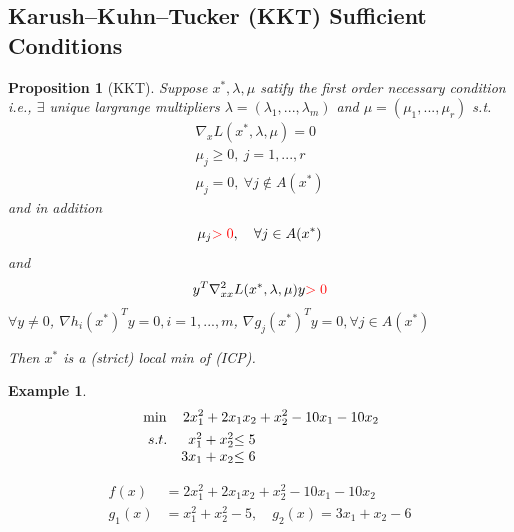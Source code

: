 \documentclass[11pt,a4paper]{article}
\newtheorem{proposition}{Proposition}
\newtheorem{example}{Example}
\begin{document}
\subsection{Karush–Kuhn–Tucker (KKT) Sufficient Conditions}
\begin{proposition}[KKT]
    Suppose $x^*,\lambda,\mu$ satify the first order necessary condition i.e., $\exists$ unique largrange multipliers $\lambda=(\lambda_1,...,\lambda_m)$ and $\mu=(\mu_1,...,\mu_r)$ s.t.
    \begin{equation}
        \begin{aligned}
            \nabla_xL(x^*,\lambda,\mu)=0\\
            \mu_j\geq 0,\ j=1,...,r\\
            \mu_j=0,\ \forall j\notin A(x^*)
        \end{aligned}
        \nonumber
    \end{equation}
    and in addition $$\mu_j {\color{red} >0},\quad \forall j\in A(x^*)$$
    and $$y^T \nabla^2_{xx}L(x^*,\lambda,\mu)y{\color{red} >0}$$
    $\forall y\neq 0$, $\nabla h_i(x^*)^Ty=0,i=1,...,m$, $\nabla g_j(x^*)^Ty=0,\forall j\in A(x^*)$

    Then $x^*$ is a (strict) local min of (ICP).
\end{proposition}
\begin{example}
    \begin{align*}
        &\min\quad 2x_1^2+2x_1x_2+x_2^2-10x_1-10x_2\\
        &\begin{array}{r@{\quad}r@{}l@{\quad}l}
        s.t.
        &x_1^2+x_2^2&\leq 5\\
        &3x_1+x_2&\leq 6\\
    \end{array}
    \end{align*}
\end{example}
\begin{equation}
    \begin{aligned}
        f(x)&=2x_1^2+2x_1x_2+x_2^2-10x_1-10x_2\\
        g_1(x)&=x_1^2+x_2^2-5,\quad g_2(x)=3x_1+x_2-6
    \end{aligned}
    \nonumber
\end{equation}
\end{document}
